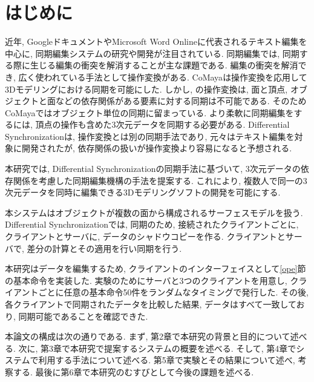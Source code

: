 \chapter{はじめに}
近年, Googleドキュメント\cite{GOOGLEDOCS}やMicrosoft Word Online\cite{WORDONLINE}に代表されるテキスト編集を中心に, 同期編集システムの研究や開発が注目されている.
同期編集では, 同期する際に生じる編集の衝突を解消することが主な課題である.
編集の衝突を解消でき, 広く使われている手法として操作変換がある.
CoMaya\cite{COMAYA}は操作変換を応用して3Dモデリングにおける同期を可能にした.
しかし, \cite{COMAYA}の操作変換は, 面と頂点, オブジェクトと面などの依存関係がある要素に対する同期は不可能である.
そのためCoMayaではオブジェクト単位の同期に留まっている.
より柔軟に同期編集をするには, 頂点の操作も含めた3次元データを同期する必要がある.
Differential Synchronization\cite{DS}は, 操作変換とは別の同期手法であり, 元々はテキスト編集を対象に開発されたが, 依存関係の扱いが操作変換より容易になると予想される.
\par
本研究では, Differential Synchronizationの同期手法に基づいて, 3次元データの依存関係を考慮した同期編集機構の手法を提案する.
これにより, 複数人で同一の3次元データを同時に編集できる3Dモデリングソフトの開発を可能にする.
\par
本システムはオブジェクトが複数の面から構成されるサーフェスモデルを扱う. Differential Synchronizationでは, 同期のため, 接続されたクライアントごとに, クライアントとサーバに, データのシャドウコピーを作る. クライアントとサーバで, 差分の計算とその適用を行い同期を行う.
\par
本研究はデータを編集するため, クライアントのインターフェイスとして\ref{ope}節の基本命令を実装した.
実験のためにサーバと3つのクライアントを用意し, クライアントごとに任意の基本命令50件をランダムなタイミングで発行した.
 その後, 各クライアントで同期されたデータを比較した結果, データはすべて一致しており, 同期可能であることを確認できた.
\par
本論文の構成は次の通りである. まず, 第2章で本研究の背景と目的について述べる. 次に, 第3章で本研究で提案するシステムの概要を述べる. そして, 第4章でシステムで利用する手法について述べる. 第5章で実験とその結果について述べ, 考察する. 最後に第6章で本研究のむすびとして今後の課題を述べる.
